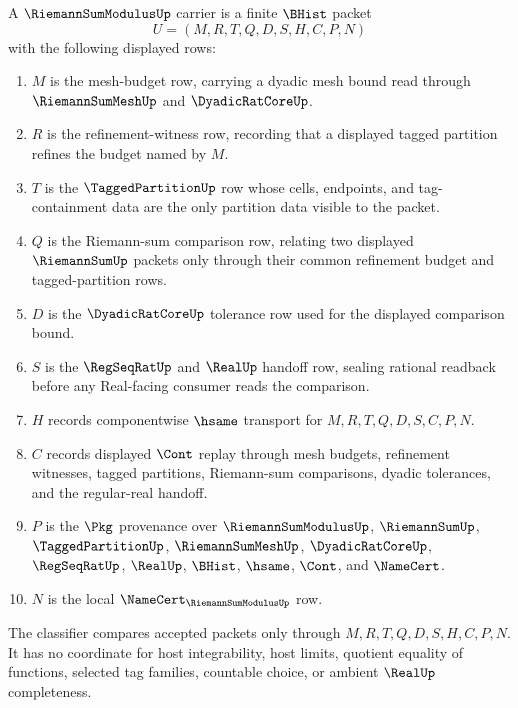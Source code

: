 \begin{definition}
\label{def:riemann-sum-modulus-carrier}
A $\RiemannSumModulusUp$ carrier is a finite $\BHist$ packet
$$
U=(M,R,T,Q,D,S,H,C,P,N)
$$
with the following displayed rows:
\begin{enumerate}
\item $M$ is the mesh-budget row, carrying a dyadic mesh bound read through $\RiemannSumMeshUp$ and $\DyadicRatCoreUp$.
\item $R$ is the refinement-witness row, recording that a displayed tagged partition refines the budget named by $M$.
\item $T$ is the $\TaggedPartitionUp$ row whose cells, endpoints, and tag-containment data are the only partition data visible to the packet.
\item $Q$ is the Riemann-sum comparison row, relating two displayed $\RiemannSumUp$ packets only through their common refinement budget and tagged-partition rows.
\item $D$ is the $\DyadicRatCoreUp$ tolerance row used for the displayed comparison bound.
\item $S$ is the $\RegSeqRatUp$ and $\RealUp$ handoff row, sealing rational readback before any Real-facing consumer reads the comparison.
\item $H$ records componentwise $\hsame$ transport for $M,R,T,Q,D,S,C,P,N$.
\item $C$ records displayed $\Cont$ replay through mesh budgets, refinement witnesses, tagged partitions, Riemann-sum comparisons, dyadic tolerances, and the regular-real handoff.
\item $P$ is the $\Pkg$ provenance over $\RiemannSumModulusUp$, $\RiemannSumUp$, $\TaggedPartitionUp$, $\RiemannSumMeshUp$, $\DyadicRatCoreUp$, $\RegSeqRatUp$, $\RealUp$, $\BHist$, $\hsame$, $\Cont$, and $\NameCert$.
\item $N$ is the local $\NameCert_{\RiemannSumModulusUp}$ row.
\end{enumerate}
The classifier compares accepted packets only through $M,R,T,Q,D,S,H,C,P,N$. It has no coordinate for host integrability, host limits, quotient equality of functions, selected tag families, countable choice, or ambient $\RealUp$ completeness.
\end{definition}

